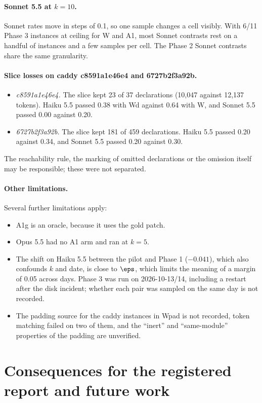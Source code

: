 \paragraph{Sonnet 5.5 at $k=10$.} Sonnet rates move in steps of 0.1, so one sample changes a cell visibly. With 6/11 Phase 3 instances at ceiling for W and A1, most Sonnet contrasts rest on a handful of instances and a few samples per cell. The Phase 2 Sonnet contrasts share the same granularity.

\paragraph{Slice losses on caddy c8591a1e46e4 and 6727b2f3a92b.}
\begin{itemize}
\item \emph{c8591a1e46e4.} The slice kept 23 of 37 declarations (10,047 against 12,137 tokens). Haiku 5.5 passed 0.38 with Wd against 0.64 with W, and Sonnet 5.5 passed 0.00 against 0.20.
\item \emph{6727b2f3a92b.} The slice kept 181 of 459 declarations. Haiku 5.5 passed 0.20 against 0.34, and Sonnet 5.5 passed 0.20 against 0.30.
\end{itemize}
The reachability rule, the marking of omitted declarations or the omission itself may be responsible; these were not separated.

\paragraph{Other limitations.} Several further limitations apply:
\begin{itemize}
\item A1g is an oracle, because it uses the gold patch.
\item Opus 5.5 had no A1 arm and ran at $k=5$.
\item The shift on Haiku 5.5 between the pilot and Phase 1 ($-0.041$), which also confounds $k$ and date, is close to $\eps$, which limits the meaning of a margin of 0.05 across days. Phase 3 was run on 2026-10-13/14, including a restart after the disk incident; whether each pair was sampled on the same day is not recorded.
\item The padding source for the caddy instances in Wpad is not recorded, token matching failed on two of them, and the ``inert'' and ``same-module'' properties of the padding are unverified.
\end{itemize}

\section{Consequences for the registered report and future work}

